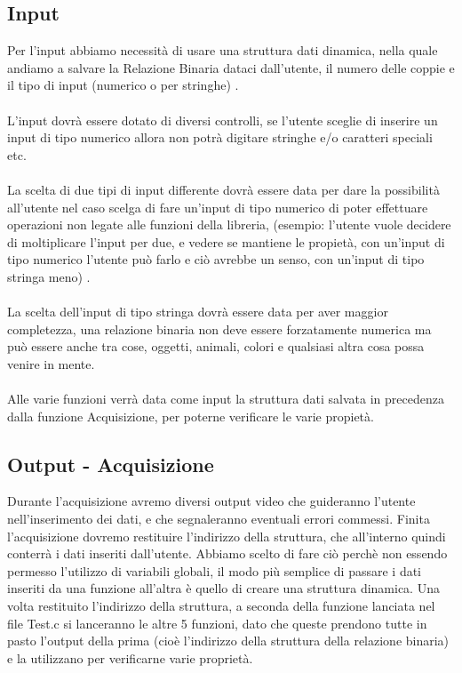 \documentclass[11pt, a4paper, titlepage, block]{article}
\begin{document}
	\subsection{Input}
	
	
	Per l'input abbiamo necessit\`a di usare una struttura dati dinamica, nella quale andiamo a salvare la Relazione Binaria dataci dall'utente, il numero delle coppie e il tipo di input (numerico o per stringhe) .\\
	\\
	L'input dovr\`a essere dotato di diversi controlli, se l'utente sceglie di inserire un input di tipo numerico allora non potr\`a digitare stringhe e/o caratteri speciali etc.\\
	\\
	La scelta di due tipi di input differente dovr\`a essere data per dare la possibilit\`a all'utente nel caso scelga di fare un'input di tipo numerico di poter effettuare operazioni non legate alle funzioni della libreria, (esempio: l'utente vuole decidere di moltiplicare l'input per due, e vedere se mantiene le propiet\`a, con un'input di tipo numerico l'utente pu\`o farlo e ci\`o avrebbe un senso, con un'input di tipo stringa meno) .\\
	\\
	La scelta dell'input di tipo stringa dovr\`a essere data per aver maggior completezza, una relazione binaria non deve essere forzatamente numerica ma pu\`o essere anche tra cose, oggetti, animali, colori e qualsiasi altra cosa possa venire in mente.\\
	\\
	Alle varie funzioni verr\`a data come input la struttura dati salvata in precedenza dalla funzione Acquisizione, per poterne verificare le varie propiet\`a.\\
	
	
	
	
	\newpage 
	\subsection{Output - Acquisizione}
	Durante l'acquisizione avremo diversi output video che guideranno l'utente nell'inserimento dei dati, e che segnaleranno eventuali errori commessi.
	Finita l'acquisizione dovremo restituire l'indirizzo della struttura, che all'interno quindi conterr\`a i dati inseriti dall'utente. Abbiamo scelto di fare ci\`o perch\`e non essendo permesso l'utilizzo di variabili globali, il modo pi\`u semplice di passare i dati inseriti da una funzione all'altra \`e quello di creare una struttura dinamica.
	Una volta restituito l'indirizzo della struttura, a seconda della funzione lanciata nel file Test.c si lanceranno le altre 5 funzioni, dato che queste prendono tutte in pasto l'output della prima (cio\`e l'indirizzo della struttura della relazione binaria) e la utilizzano per verificarne varie propriet\`a.\\
	\\
\end{document}
